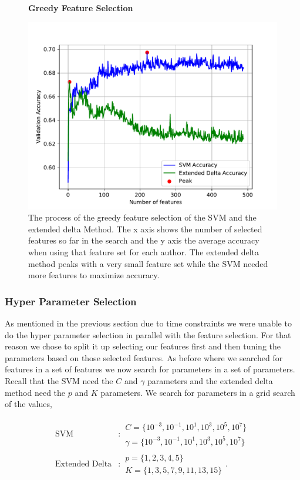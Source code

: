 \begin{figure}
    \centering
    \textbf{Greedy Feature Selection}\par\medskip
    \includegraphics[scale=0.6]{./pictures/experiments/feature_selection}
    \caption{The process of the greedy feature selection of the SVM and the
        extended delta Method. The x axis shows the number of selected features
        so far in the search and the y axis the average accuracy when using that
        feature set for each author. The extended delta method peaks with a very
        small feature set while the \gls{SVM} needed more features to maximize
        accuracy.
    }
    \label{fig:fs_results}
\end{figure}


\subsubsection{Hyper Parameter Selection}\label{sec:hyp_select}

As mentioned in the previous section due to time constraints we were unable
to do the hyper parameter selection in parallel with the feature selection.
For that reason we chose to split it up selecting our features first and then
tuning the parameters based on those selected features. As before where we
searched for features in a set of features we now search for parameters in a set
of parameters. Recall that the \gls{SVM} need the $C$ and $\gamma$ parameters
and the extended delta method need the $p$ and $K$ parameters. We search for
parameters in a grid search of the values,

\begin{align}
    \text{SVM} &:
    \begin{array}{lr}
        C=\{10^{-3}, 10^{-1}, 10^{1}, 10^{3}, 10^{5}, 10^7\}\\
        \gamma=\{10^{-3}, 10^{-1}, 10^{1}, 10^{3}, 10^{5}, 10^7\}
    \end{array} \\
    \text{Extended Delta} &:
    \begin{array}{lr}
        p=\{1,2,3,4,5\}\\
        K=\{1,3,5,7,9,11,13,15\}
    \end{array}.
\end{align}


